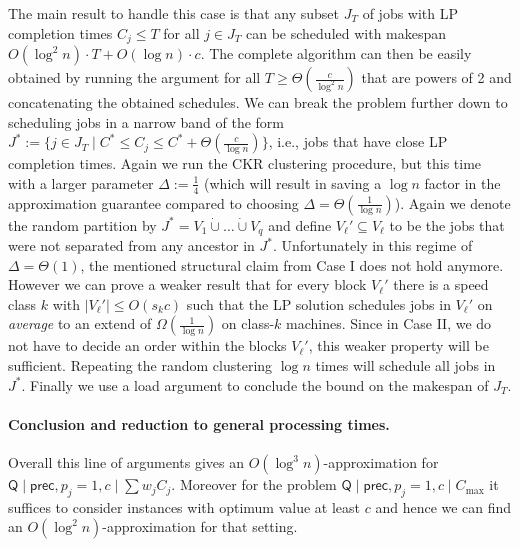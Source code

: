   The main result to handle this case is that any subset $J_T$ of jobs with LP completion times $C_j \leq T$ for all $j \in J_T$
  can be scheduled with makespan  $O(\log^2 n) \cdot T + O(\log n) \cdot c$. The complete algorithm can then be easily obtained by running the argument for all $T \geq \Theta(\frac{c}{\log^2 n})$ that are powers of 2 and concatenating the obtained schedules. We can break the problem further down to scheduling jobs in a narrow band of the form $J^* := \{ j \in J_T \mid C^* \leq C_j \leq C^* + \Theta(\frac{c}{\log n}) \}$, i.e., jobs that have close LP completion times. Again we run the CKR clustering procedure, but this time with a larger parameter $\Delta := \frac{1}{4}$ (which will result in saving a $\log n$ factor in the approximation guarantee compared to choosing $\Delta = \Theta(\frac{1}{\log n})$). Again we denote the random partition by $J^* = V_{1} \dot{\cup} \ldots \dot{\cup} V_q$ and define $V_{\ell}' \subseteq V_{\ell}$ to be the jobs that were not separated from any ancestor in $J^*$. Unfortunately in this regime of $\Delta = \Theta(1)$, the mentioned structural claim from Case I does not hold anymore. However we can prove a weaker result that for every block $V_{\ell}'$ there is a speed class $k$ with $|V_{\ell}'| \leq O(s_k c)$
  such that the LP solution schedules jobs in $V_{\ell}'$ on \emph{average} to an extend of $\Omega(\frac{1}{\log n})$ on class-$k$ machines.
  Since in Case II, we do not have to decide an order within the blocks $V_{\ell}'$, this weaker property will be sufficient.
  Repeating the random clustering $\log n$ times will schedule all jobs in $J^*$.
  Finally we use a load argument to conclude the bound on the makespan of $J_T$.  
  
  
  \paragraph{Conclusion and reduction to general processing times.}
  Overall this line of arguments gives an $O(\log^3 n)$-approximation for  $\mathsf{Q} \mid \mathsf{prec}, p_j=1, c \mid \sum w_jC_j$. Moreover for the problem  $\mathsf{Q} \mid \mathsf{prec}, p_j=1, c \mid C_{\max}$ it suffices to
  consider instances with optimum value at least  $c$ and hence we can find an $O(\log^2 n)$-approximation for that setting.
  
